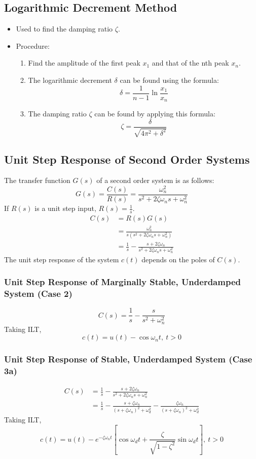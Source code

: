 \documentclass[a4paper]{article}
\begin{document}
\subsection{Logarithmic Decrement Method}
\begin{itemize}
    \item Used to find the damping ratio $\zeta$.
    \item Procedure:
    \begin{enumerate}
        \item Find the amplitude of the first peak $x_1$ and that of the nth peak $x_n$.
        \item The logarithmic decrement $\delta$ can be found using the formula:
        $$\delta = \frac{1}{n-1}\ln \frac{x_1}{x_n}$$
        \item The damping ratio $\zeta$ can be found by applying this formula:
        $$\zeta = \frac{\delta}{\sqrt{4\pi^2+\delta^2}}$$
    \end{enumerate}
\end{itemize}

\subsection{Unit Step Response of Second Order Systems}
The transfer function $G(s)$ of a second order system is as follows:
$$G(s) = \frac{C(s)}{R(s)} = \frac{\omega_n^2}{s^2+2\zeta\omega_n s+\omega_n^2}$$
If $R(s)$ is a unit step input, $R(s) = \displaystyle\frac{1}{s}$.
\begin{align*}
    C(s) &= R(s)G(s)\\
    &= \frac{\omega_n^2}{s(s^2+2\zeta\omega_n s+\omega_n^2)}\\
    &= \frac{1}{s}-\frac{s+2\zeta\omega_n}{s^2+2\zeta\omega_n s+\omega_n^2}
\end{align*}
The unit step response of the system $c(t)$ depends on the poles of $C(s)$.

\subsubsection{Unit Step Response of Marginally Stable, Underdamped System (Case 2)}
$$C(s) = \frac{1}{s}-\frac{s}{s^2+\omega_n^2}$$
Taking ILT,
$$c(t) = u(t)-\cos \omega_n t,\ t>0$$

\subsubsection{Unit Step Response of Stable, Underdamped System (Case 3a)}
\begin{align*}
    C(s) &= \frac{1}{s}-\frac{s+2\zeta\omega_n}{s^2+2\zeta\omega_n s+\omega_n^2}\\
    &= \frac{1}{s}-\frac{s+\zeta\omega_n}{(s+\zeta\omega_n)^2+\omega_d^2}-\frac{\zeta\omega_n}{(s+\zeta\omega_n)^2+\omega_d^2}
\end{align*}
Taking ILT,
$$c(t) = u(t)-e^{-\zeta\omega_n t}\left[\cos\omega_d t+\frac{\zeta}{\sqrt{1-\zeta^2}}\sin\omega_d t\right],\ t>0$$
\end{document}
